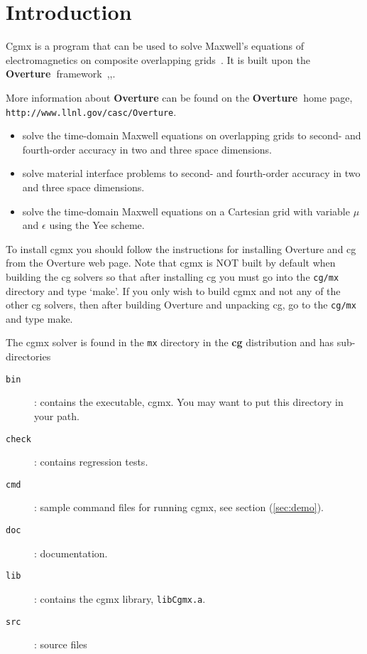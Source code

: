 \documentclass{article}
\newcommand{\Overture}{{\bf Overture\ }}
\begin{document}
\clearpage
\tableofcontents


\vfill\eject

\section{Introduction}

   Cgmx is a program that can be used to solve Maxwell's equations of electromagnetics 
on composite overlapping grids~\cite{max2006b}. It is built upon
the \Overture framework~\cite{Brown97},\cite{Henshaw96a},\cite{iscope97}.

More information about
{\bf Overture} can be found on the \Overture home page, {\tt http://www.llnl.gov/\-casc/\-Overture}.



\begin{itemize}
  \item solve the time-domain Maxwell equations on overlapping grids to second- and fourth-order accuracy in two and three space dimensions. 
  \item solve material interface problems to second- and fourth-order accuracy in two and three space dimensions. 
  \item solve the time-domain Maxwell equations on a Cartesian grid with variable $\mu$ and $\epsilon$ using the Yee scheme.
\end{itemize}


 To install cgmx you should follow the instructions for installing Overture and cg
from the Overture web page. Note that cgmx is NOT built by default when building the cg solvers so that
after installing cg you must go into the {\tt cg/mx} directory and type `make'. 
If you only wish to build cgmx and not any of the other cg solvers, then
after building Overture and unpacking cg, go to the {\tt cg/mx} and type make. 

\noindent The cgmx solver is found in the {\tt mx} directory in the {\bf cg} distribution and has
sub-directories
\begin{description}
 \item[{\tt bin}] : contains the executable, cgmx. You may want to put this directory in your path.
 \item[{\tt check}] : contains regression tests.
 \item[{\tt cmd}] : sample command files for running cgmx, see section (\ref{sec:demo}).
 \item[{\tt doc}] : documentation.
 \item[{\tt lib}] : contains the cgmx library, {\tt libCgmx.a}.
 \item[{\tt src}] : source files 
\end{description}
\end{document}
